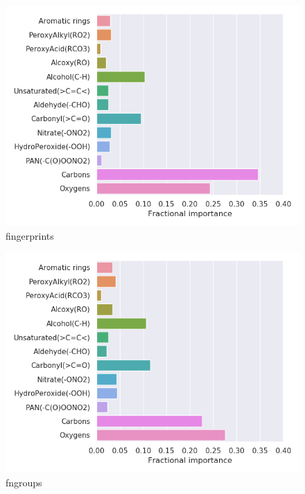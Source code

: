 
\begin{subfigure}[b]{0.5\textwidth}
    \centering
    \includegraphics[width=\textwidth]{outputs/t-SNE/fingerprints/legend.png}
    \caption{fingerprints}
    \label{fig:legend_t-SNE_fingerprints}
\end{subfigure}
\begin{subfigure}[b]{0.5\textwidth}
    \centering
    \includegraphics[width=\textwidth]{outputs/t-SNE/fngroups/legend.png}
    \caption{fngroups}
    \label{fig:legend_t-SNE_fngroups}
\end{subfigure}
